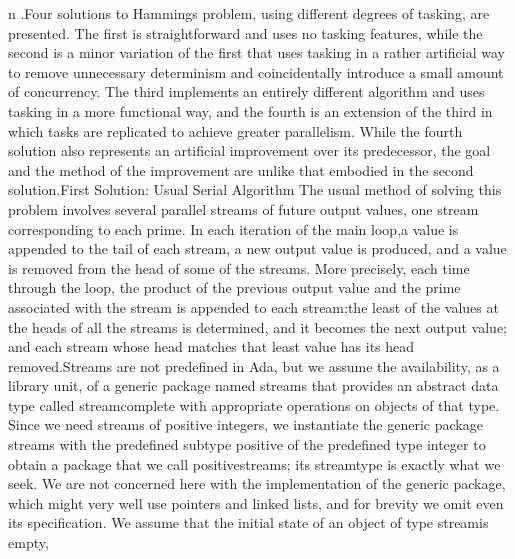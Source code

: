 \InlEqn[]\LmthEqn[]n
\LmthEndeqn[]\EndInlEqn[].\Endpara[]
\Para[]Four solutions to Hamming\rsquo[]s problem, using different
degrees of tasking, are presented. The first is straightforward and
uses no tasking features, while the second is a minor variation of
the first that uses tasking in a rather artificial way to remove unnecessary
determinism and coincidentally introduce a small amount of concurrency.
The third implements an entirely different algorithm and uses tasking
in a more functional way, and the fourth is an extension of the third
in which tasks are replicated to achieve greater parallelism. While
the fourth solution also represents an artificial improvement over
its predecessor, the goal and the method of the improvement are unlike
that embodied in the second solution.\Endpara[]
\DivLiv[]\HdMinLiv[]First Solution: Usual Serial Algorithm%
\HdMinEndiv[]
\Para[]The usual method of solving this problem involves several parallel
streams of future output values, one stream corresponding to each
prime. In each iteration of the \ldquo[]main loop,\rdquo[] a value
is appended to the tail of each stream, a new output value is produced,
and a value is removed from the head of some of the streams. More
precisely, each time through the loop,
\LstList[]
\LstItem[]the product of the previous output value and the prime associated
with the stream is appended to each stream;\LstEnditem[]
\LstItem[]the least of the values at the heads of all the streams
is determined, and it becomes the next output value; and%
\LstEnditem[]
\LstItem[]each stream whose head matches that least value has its
head removed.\LstEnditem[]
\LstEndlist[]
\Endpara[]
\Para[]Streams are not predefined in Ada, but we assume the availability,
as a library unit, of a generic package named \tyxffmxmono[]streams%
\tyxffmxendmono[] that provides an abstract data type called %
\tyxffmxmono[]stream\tyxffmxendmono[] complete with appropriate operations
on objects of that type. Since we need streams of positive integers,
we instantiate the generic package \tyxffmxmono[]streams%
\tyxffmxendmono[] with the predefined subtype \tyxffmxmono[]positive%
\tyxffmxendmono[] of the predefined type \tyxffmxmono[]integer%
\tyxffmxendmono[] to obtain a package that we call %
\tyxffmxmono[]positive\Symuns[]streams\tyxffmxendmono[]; its %
\tyxffmxmono[]stream\tyxffmxendmono[] type is exactly what we seek.
We are not concerned here with the implementation of the generic package,
which might very well use pointers and linked lists, and for brevity
we omit even its specification. We assume that the initial state of
an object of type \tyxffmxmono[]stream\tyxffmxendmono[] is \ldquo[]empty,\rdquo[]
